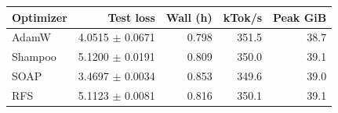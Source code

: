 \begin{tabular}{lrrrr}
\toprule
Optimizer & Test loss & Wall (h) & kTok/s & Peak GiB \\
\midrule
AdamW & 4.0515 $\pm$ 0.0671 & 0.798 & 351.5 & 38.7 \\
Shampoo & 5.1200 $\pm$ 0.0191 & 0.809 & 350.0 & 39.1 \\
SOAP & 3.4697 $\pm$ 0.0034 & 0.853 & 349.6 & 39.0 \\
RFS & 5.1123 $\pm$ 0.0081 & 0.816 & 350.1 & 39.1 \\
\bottomrule
\end{tabular}
